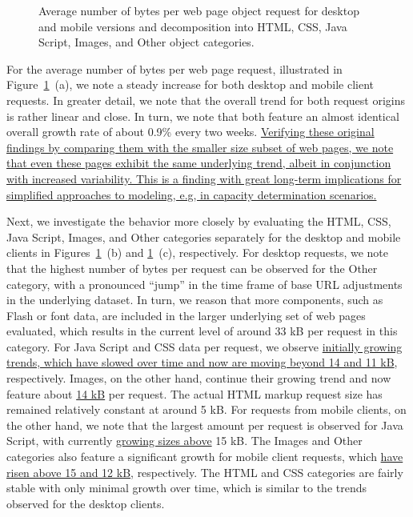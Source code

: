 \documentclass[onecolumn,12pt]{IEEEtran}
\begin{document}
\begin{figure}
	\caption{Average number of bytes per web page object request for desktop and mobile versions and decomposition into  HTML, CSS, Java Script, Images, and Other object categories.\label{fig:relative}}
\end{figure}
For the average number of bytes per web page request, illustrated in Figure~\ref{fig:relative}~(a), we note a steady increase for both desktop and mobile client requests. 
In greater detail, we note that the overall trend for both request origins is rather linear and close.
In turn, we note that both feature an almost identical overall growth rate of about 0.9\% every two weeks.
\uline{Verifying these original findings by comparing them with the smaller size subset of web pages, we note that even these pages exhibit the same underlying trend, albeit in conjunction with increased variability.
	This is a finding with great long-term implications for simplified approaches to modeling, e.g, in capacity determination scenarios.}

Next, we investigate the behavior more closely by evaluating the HTML, CSS, Java Script, Images, and Other categories separately for the desktop and mobile clients in Figures~\ref{fig:relative}~(b) and \ref{fig:relative}~(c), respectively.
For desktop requests, we note that the highest number of bytes per request can be observed for the Other category, with a pronounced ``jump'' in the time frame of base URL adjustments in the underlying dataset. 
In turn, we reason that more components, such as Flash or font data, are included in the larger underlying set of web pages evaluated, which results in the current level of around 33 kB per request in this category.
For Java Script and CSS data per request, we observe  \uline{initially growing trends, which have slowed over time and now are moving beyond 14 and 11 kB}, respectively.
Images, on the other hand, continue their growing trend and now feature about \uline{14 kB} per request.
The actual HTML markup request size has remained relatively constant at around 5 kB.
For requests from mobile clients, on the other hand, we note that the largest amount per request is observed for Java Script, with currently \uline{growing sizes above} 15 kB.
The Images and Other categories also feature a significant growth for mobile client requests, which \uline{have risen above 15 and 12 kB}, respectively.
The HTML and CSS categories are fairly stable with only minimal growth over time, which is similar to the trends observed for the desktop clients.
\end{document}
